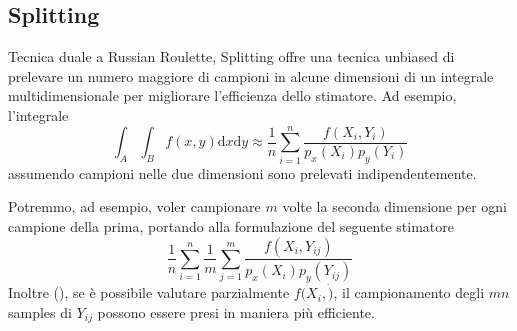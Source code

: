 \subsection{Splitting}
Tecnica duale a Russian Roulette, Splitting offre una tecnica unbiased di prelevare un numero maggiore di campioni in alcune dimensioni di un 
integrale multidimensionale per migliorare l'efficienza dello stimatore. Ad esempio, l'integrale 
\begin{equation*}
	\int_A\int_Bf(x,y)\mathrm{d}x\mathrm{d}y\approx\frac{1}{n}\sum_{i=1}^n\frac{f(X_i,Y_i)}{p_x(X_i)p_y(Y_i)}
\end{equation*}
assumendo campioni nelle due dimensioni sono prelevati indipendentemente.\par
Potremmo, ad esempio, voler campionare $m$ volte la seconda dimensione per ogni campione della prima, portando alla formulazione del seguente stimatore
\begin{equation*}
	\frac{1}{n}\sum_{i=1}^n\frac{1}{m}\sum_{j=1}^m\frac{f(X_i,Y_{ij})}{p_x(X_i)p_y(Y_{ij})}
\end{equation*}
Inoltre (\cite{pharr}), se \`e possibile valutare parzialmente $f(X_i,\dot)$, il campionamento degli $mn$ samples di $Y_{ij}$ possono essere presi 
in maniera pi\`u efficiente.
